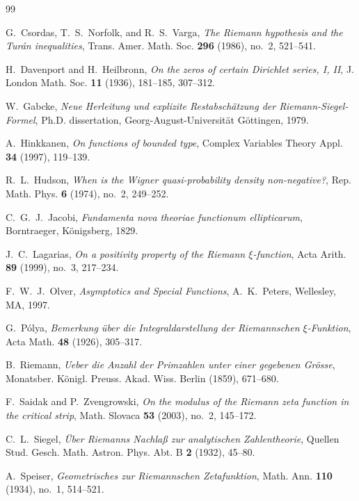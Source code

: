 \documentclass[11pt,reqno]{amsart}
\theoremstyle{definition}
\theoremstyle{remark}
\numberwithin{equation}{section}
\begin{document}
\begin{thebibliography}{99}

G.~Csordas, T.~S.~Norfolk, and R.~S.~Varga,
\emph{The Riemann hypothesis and the Tur\'an inequalities},
Trans. Amer. Math. Soc. \textbf{296} (1986), no.~2, 521--541.

H.~Davenport and H.~Heilbronn,
\emph{On the zeros of certain Dirichlet series, I, II},
J. London Math. Soc. \textbf{11} (1936), 181--185, 307--312.

W.~Gabcke,
\emph{Neue Herleitung und explizite Restabsch\"atzung der Riemann-Siegel-Formel},
Ph.D. dissertation, Georg-August-Universit\"at G\"ottingen, 1979.

A.~Hinkkanen,
\emph{On functions of bounded type},
Complex Variables Theory Appl. \textbf{34} (1997), 119--139.

R.~L.~Hudson,
\emph{When is the Wigner quasi-probability density non-negative?},
Rep. Math. Phys. \textbf{6} (1974), no.~2, 249--252.

C.~G.~J.~Jacobi,
\emph{Fundamenta nova theoriae functionum ellipticarum},
Borntraeger, K\"onigsberg, 1829.

J.~C.~Lagarias,
\emph{On a positivity property of the Riemann $\xi$-function},
Acta Arith. \textbf{89} (1999), no.~3, 217--234.

F.~W.~J.~Olver,
\emph{Asymptotics and Special Functions},
A.~K.~Peters, Wellesley, MA, 1997.

G.~P\'olya,
\emph{Bemerkung \"uber die Integraldarstellung der Riemannschen $\xi$-Funktion},
Acta Math. \textbf{48} (1926), 305--317.

B.~Riemann,
\emph{Ueber die Anzahl der Primzahlen unter einer gegebenen Gr\"osse},
Monatsber. K\"onigl. Preuss. Akad. Wiss. Berlin (1859), 671--680.

F.~Saidak and P.~Zvengrowski,
\emph{On the modulus of the Riemann zeta function in the critical strip},
Math. Slovaca \textbf{53} (2003), no.~2, 145--172.

C.~L.~Siegel,
\emph{\"Uber Riemanns Nachla\ss{} zur analytischen Zahlentheorie},
Quellen Stud. Gesch. Math. Astron. Phys. Abt. B \textbf{2} (1932), 45--80.

A.~Speiser,
\emph{Geometrisches zur Riemannschen Zetafunktion},
Math. Ann. \textbf{110} (1934), no.~1, 514--521.


\end{thebibliography}
\end{document}

